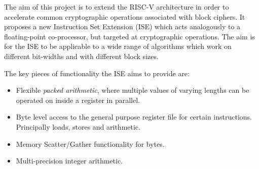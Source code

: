 

The aim of this project is to
extend the RISC-V architecture in order to accelerate common cryptographic
operations associated with block ciphers.
It proposes a new Instruction Set Extension (ISE)
which acts analogously to a floating-point co-processor,
but targeted at cryptographic operations.
The aim is for the ISE to be applicable to a wide range of algorithms
which work on different bit-widths and with different block sizes.

The key pieces of functionality the ISE aims to provide are:

\begin{itemize}
\item Flexible {\em packed arithmetic}, where multiple values of varying
    lengths can be operated on inside a register in parallel.
\item Byte level access to the general purpose register file for certain
    instructions. Principally loads, stores and arithmetic.
\item Memory Scatter/Gather functionality for bytes.
\item Multi-precision integer arithmetic.
\end{itemize}
